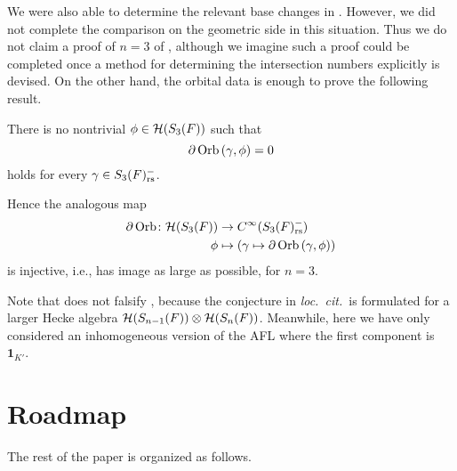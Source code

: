 We were also able to determine the
relevant base changes in .
However, we did not complete the comparison on the geometric side in this situation.
Thus we do not claim a proof of $n = 3$ of ,
although we imagine such a proof could be completed
once a method for determining the intersection numbers explicitly is devised.
On the other hand, the orbital data is enough to prove the following result.
\begin{theorem}
  \label{thm:no_kernel_group}
  There is no nontrivial $\phi \in \mathcal H(S_3(F))$ such that
  \[ \partial \operatorname{Orb} \left( \gamma, \phi \right) = 0 \]
  holds for every $\gamma \in S_3(F)_{\mathrm{rs}}^-$.
\end{theorem}
Hence the analogous map
\begin{align*}
  \partial\operatorname{Orb} \colon \mathcal H(S_3(F)) &\to C^\infty(S_3(F)_{\mathrm{rs}}^-) \\
  \phi &\mapsto \left( \gamma \mapsto \partial \operatorname{Orb} \left(\gamma, \phi \right) \right)
\end{align*}
is injective, i.e., has image as large as possible, for $n = 3$.

\begin{remark}
  Note that  does not falsify
  \cite[Conjecture 1.0.2]{ref:AFLspherical},
  because the conjecture in \emph{loc.\ cit.}\ is formulated
  for a larger Hecke algebra $\mathcal H(S_{n-1}(F)) \otimes \mathcal H(S_n(F))$.
  Meanwhile, here we have only considered an inhomogeneous version of the AFL
  where the first component is $\mathbf{1}_{K'}$.
\end{remark}

\section{Roadmap}
The rest of the paper is organized as follows.

